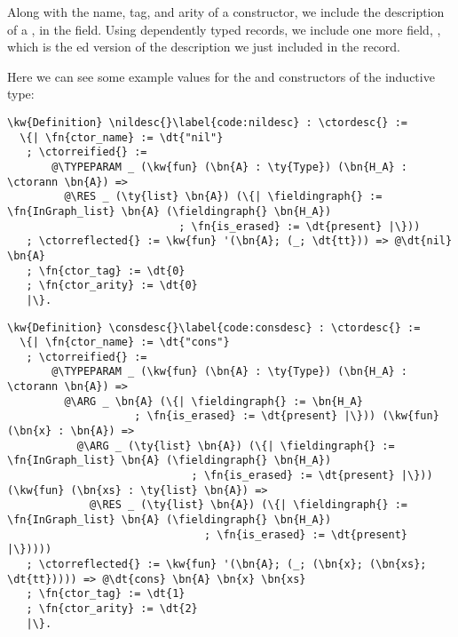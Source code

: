 Along with the name, \gls{tag}, and arity of a constructor, we include the \reified{} description of a \constructor{}, in the \ctorreified{} field. Using dependently typed records, we include one more field, \ctorreflected{}, which is the ed version of the \reified{} description we just included in the record.


Here we can see some example \ctordesc{} values for the  and  constructors of the  \gls{inductive type}:

\newcommand{\nildesc}{\hyperref[code:nildesc]{\fn{nil\_\linebreak[0]desc}}}
\begin{Verbatim}
\kw{Definition} \nildesc{}\label{code:nildesc} : \ctordesc{} :=
  \{| \fn{ctor_name} := \dt{"nil"}
   ; \ctorreified{} :=
       @\TYPEPARAM _ (\kw{fun} (\bn{A} : \ty{Type}) (\bn{H_A} : \ctorann \bn{A}) =>
         @\RES _ (\ty{list} \bn{A}) (\{| \fieldingraph{} := \fn{InGraph_list} \bn{A} (\fieldingraph{} \bn{H_A}) 
                           ; \fn{is_erased} := \dt{present} |\}))
   ; \ctorreflected{} := \kw{fun} '(\bn{A}; (_; \dt{tt})) => @\dt{nil} \bn{A}
   ; \fn{ctor_tag} := \dt{0}
   ; \fn{ctor_arity} := \dt{0}
   |\}.
\end{Verbatim}

\newcommand{\consdesc}{\hyperref[code:consdesc]{\fn{cons\_\linebreak[0]desc}}}
\begin{Verbatim}
\kw{Definition} \consdesc{}\label{code:consdesc} : \ctordesc{} :=
  \{| \fn{ctor_name} := \dt{"cons"}
   ; \ctorreified{} :=
       @\TYPEPARAM _ (\kw{fun} (\bn{A} : \ty{Type}) (\bn{H_A} : \ctorann \bn{A}) =>
         @\ARG _ \bn{A} (\{| \fieldingraph{} := \bn{H_A} 
                    ; \fn{is_erased} := \dt{present} |\})) (\kw{fun} (\bn{x} : \bn{A}) =>
           @\ARG _ (\ty{list} \bn{A}) (\{| \fieldingraph{} := \fn{InGraph_list} \bn{A} (\fieldingraph{} \bn{H_A}) 
                             ; \fn{is_erased} := \dt{present} |\})) (\kw{fun} (\bn{xs} : \ty{list} \bn{A}) =>
             @\RES _ (\ty{list} \bn{A}) (\{| \fieldingraph{} := \fn{InGraph_list} \bn{A} (\fieldingraph{} \bn{H_A}) 
                               ; \fn{is_erased} := \dt{present} |\}))))
   ; \ctorreflected{} := \kw{fun} '(\bn{A}; (_; (\bn{x}; (\bn{xs}; \dt{tt})))) => @\dt{cons} \bn{A} \bn{x} \bn{xs}
   ; \fn{ctor_tag} := \dt{1}
   ; \fn{ctor_arity} := \dt{2}
   |\}.
\end{Verbatim}


